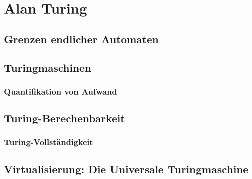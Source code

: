 \chapter{Alan Turing}
\section{Grenzen endlicher Automaten}\label{pumping}
\section{Turingmaschinen}
\subsection{Quantifikation von Aufwand}
\section{Turing-Berechenbarkeit}
\subsection{Turing-Vollständigkeit}\label{turingVollstaendigkeit}
\section{Virtualisierung: Die Universale Turingmaschine}
